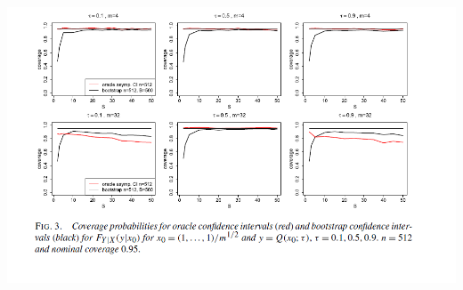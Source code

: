 \documentclass[11pt]{beamer}
\begin{document}
\begin{frame}
\includegraphics[scale=1]{fig3.png}
\end{frame}
\end{document}
